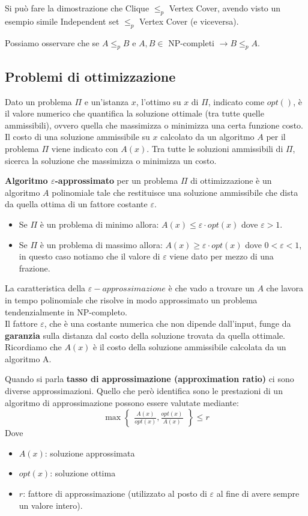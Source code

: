 Si può fare la dimostrazione che Clique $\leq_p$ Vertex Cover, avendo visto un esempio simile Independent set $\leq_p$ Vertex Cover (e viceversa). \hfill

Possiamo osservare che se $A \leq_p B$ e $A, B \in$ NP-completi $\to B \leq_p A$.\hfill
\subsection{Problemi di ottimizzazione}
Dato un problema $\Pi$ e un'istanza $x$, l'ottimo su $x$ di $\Pi$, indicato come $opt()$, è il valore numerico che quantifica la soluzione ottimale (tra tutte quelle ammissibili), ovvero quella che massimizza o minimizza una certa funzione costo. Il costo di una soluzione ammissibile su $x$ calcolato da un algoritmo $A$ per il problema $\Pi$ viene indicato con $A(x)$. Tra tutte le soluzioni ammissibili di $\Pi$, sicerca la soluzione che massimizza o minimizza un costo. 

\textbf{Algoritmo $\varepsilon$-approssimato} per un problema $\Pi$ di ottimizzazione è un algoritmo $A$ polinomiale tale che restituisce una soluzione ammissibile che dista da quella ottima di un fattore costante $\varepsilon$. 
\begin{itemize}
    \item Se $\Pi$ è un problema di minimo allora: $A(x) \leq \varepsilon \cdot opt(x)$ dove $\varepsilon > 1$.
    \item Se $\Pi$ è un problema di massimo allora: $A(x) \geq \varepsilon \cdot opt(x)$ dove $0 < \varepsilon < 1$, in questo caso notiamo che il valore di $\varepsilon$ viene dato per mezzo di una frazione.
\end{itemize}
La caratteristica della $\varepsilon - approssimazione$ è che vado a trovare un $A$ che lavora in tempo polinomiale che risolve in modo approssimato un problema tendenzialmente in NP-completo. \\
Il fattore $\varepsilon$, che è una costante numerica che non dipende dall'input, funge da \textbf{garanzia} sulla distanza dal costo della soluzione trovata da quella ottimale. Ricordiamo che $A(x)$ è il costo della soluzione ammissibile calcolata da un algoritmo A.

Quando si parla \textbf{tasso di approssimazione (approximation ratio)} ci sono diverse approssimazioni. Quello che però identifica sono le prestazioni di un algoritmo di approssimazione possono essere valutate mediante: 
\[
    \max
    \begin{Bmatrix}
    \displaystyle \frac{A(x)}{opt(x)}, \frac{opt(x)}{A(x)}
    \end{Bmatrix}
    \leq r
\]
Dove
\begin{itemize}
    \itemsep1pt\parskip0pt
    \item $A(x)$: soluzione approssimata
    \item $opt(x)$: soluzione ottima
    \item $r$: fattore di approssimazione (utilizzato al posto di $\varepsilon$ al fine di avere sempre un valore intero).
\end{itemize}

